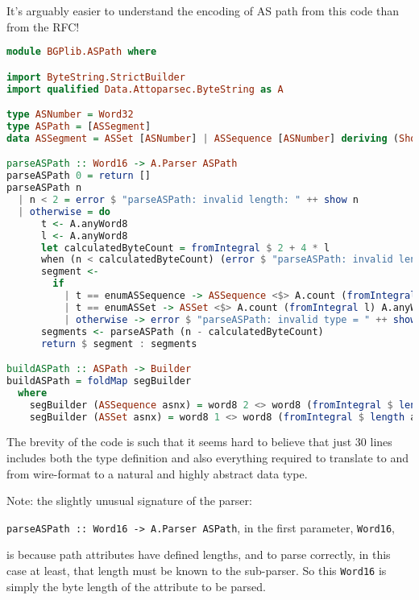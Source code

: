 It's arguably easier to understand the encoding of AS path from this code than from the RFC!
\lstset{frame = tb, numbers = left }
\begin{lstlisting}[language=haskell, title=BGPlib/ASPath.hs (only non-CODEC helper functions removed)]
module BGPlib.ASPath where

import ByteString.StrictBuilder
import qualified Data.Attoparsec.ByteString as A

type ASNumber = Word32
type ASPath = [ASSegment]
data ASSegment = ASSet [ASNumber] | ASSequence [ASNumber] deriving (Show, Eq, Generic)

parseASPath :: Word16 -> A.Parser ASPath
parseASPath 0 = return []
parseASPath n
  | n < 2 = error $ "parseASPath: invalid length: " ++ show n
  | otherwise = do
      t <- A.anyWord8
      l <- A.anyWord8
      let calculatedByteCount = fromIntegral $ 2 + 4 * l
      when (n < calculatedByteCount) (error $ "parseASPath: invalid length n=" ++ show n ++ " l=" ++ show l ++ " t=" ++ show t)
      segment <-
        if
          | t == enumASSequence -> ASSequence <$> A.count (fromIntegral l) A.anyWord32be
          | t == enumASSet -> ASSet <$> A.count (fromIntegral l) A.anyWord32be
          | otherwise -> error $ "parseASPath: invalid type = " ++ show t
      segments <- parseASPath (n - calculatedByteCount)
      return $ segment : segments

buildASPath :: ASPath -> Builder
buildASPath = foldMap segBuilder
  where
    segBuilder (ASSequence asnx) = word8 2 <> word8 (fromIntegral $ length asnx) <> foldMap word32BE asnx
    segBuilder (ASSet asnx) = word8 1 <> word8 (fromIntegral $ length asnx) <> foldMap word32BE asnx
\end{lstlisting}

The brevity of the code is such that it seems hard to believe that just 30 lines includes both the type definition and also everything required to translate to and from wire-format to a natural and highly abstract data type.

\bigskip

Note: the slightly unusual signature of the parser:

\lstinline{parseASPath :: Word16 -> A.Parser ASPath}, in the first parameter, \lstinline{Word16},

is because path attributes have defined lengths, and to parse correctly, in this case at least, that length must be known to the sub-parser.  So this \lstinline{Word16} is simply the byte length of the attribute to be parsed.

